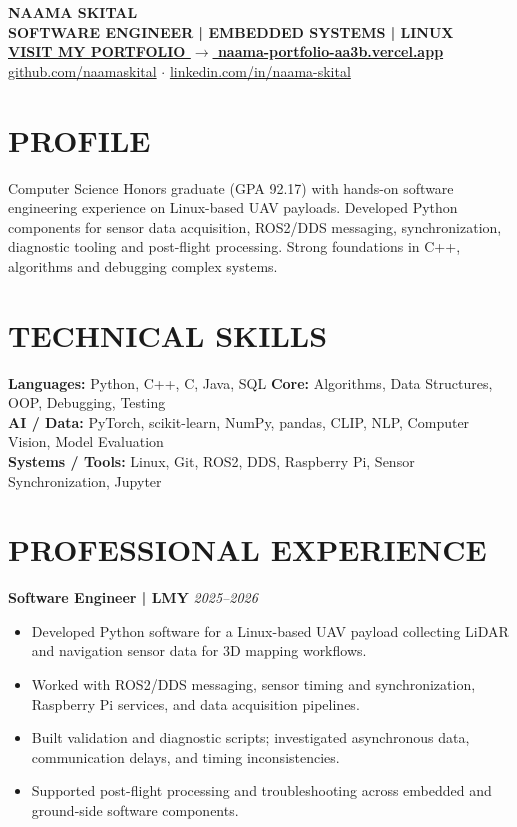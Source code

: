 \documentclass[10pt,a4paper]{article}
\begin{document}
\linespread{0.96}\selectfont
\begin{center}
{\fontsize{23}{26}\selectfont\bfseries\color{navy} NAAMA SKITAL}\\[3pt]
{\color{purple}\bfseries SOFTWARE ENGINEER \quad | \quad EMBEDDED SYSTEMS \quad | \quad LINUX}\\[5pt]
{\fontsize{13}{16}\selectfont\bfseries\color{portfolioBlue}\href{https://naama-portfolio-aa3b.vercel.app/}{VISIT MY PORTFOLIO  $\longrightarrow$  naama-portfolio-aa3b.vercel.app}}\\[4pt]
\href{https://github.com/naamaskital}{github.com/naamaskital} \quad $\cdot$ \quad \href{https://www.linkedin.com/in/naama-skital/}{linkedin.com/in/naama-skital}
\end{center}
\section*{PROFILE}
Computer Science Honors graduate (GPA 92.17) with hands-on software engineering experience on Linux-based UAV payloads. Developed Python components for sensor data acquisition, ROS2/DDS messaging, synchronization, diagnostic tooling and post-flight processing. Strong foundations in C++, algorithms and debugging complex systems.
\section*{TECHNICAL SKILLS}
\textbf{Languages:} Python, C++, C, Java, SQL \quad \textbf{Core:} Algorithms, Data Structures, OOP, Debugging, Testing\\
\textbf{AI / Data:} PyTorch, scikit-learn, NumPy, pandas, CLIP, NLP, Computer Vision, Model Evaluation\\
\textbf{Systems / Tools:} Linux, Git, ROS2, DDS, Raspberry Pi, Sensor Synchronization, Jupyter
\section*{PROFESSIONAL EXPERIENCE}
\textbf{Software Engineer \quad | \quad LMY} \hfill \textit{2025--2026}
\begin{itemize}
\item Developed Python software for a Linux-based UAV payload collecting LiDAR and navigation sensor data for 3D mapping workflows.
\item Worked with ROS2/DDS messaging, sensor timing and synchronization, Raspberry Pi services, and data acquisition pipelines.
\item Built validation and diagnostic scripts; investigated asynchronous data, communication delays, and timing inconsistencies.
\item Supported post-flight processing and troubleshooting across embedded and ground-side software components.
\end{itemize}
\end{document}
